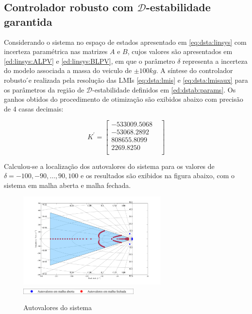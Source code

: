 \subsection{Controlador robusto com \( \mathcal{D}\)-estabilidade garantida}\label{subsec:res:control}
Considerando o sistema no espaço de estados apresentado em \eqref{eq:dsta:linsys} com incerteza paramétrica nas matrizes $A$ e $B$, cujos valores são apresentados em \eqref{ed:linsys:ALPV} e \eqref{ed:linsys:BLPV}, em que o parâmetro $\delta$ representa a incerteza do modelo associada a massa do veiculo de $\pm100kg$. A síntese do  controlador  robusto ́e  realizada  pela  resolução das LMIs \eqref{eq:dsta:lmis} e \eqref{eq:dsta:lmisaux} para os parâmetros da região de \( \mathcal{D}\)-estabilidade definidos em \eqref{ed:dstab:params}. Os ganhos obtidos do procedimento de otimização são exibidos abaixo com precisão de 4 casas decimais:

\begin{equation*} \label{eq:ganhoscontrolador}
    K^'=
    \begin{bmatrix}
        -533009.5068&\\	
        -53068.2892&\\	
        808655.8099&\\
        2269.8250&\\
    \end{bmatrix}
\end{equation*}

Calculou-se a localização dos autovalores do sistema para os valores de $\delta = -100, -90, \dots, 90, 100$ e os resultados são exibidos na figura abaixo, com o sistema em malha aberta e malha fechada.
\FloatBarrier
\begin{figure}[htbp]
    \begin{centering}
    \includegraphics[width=7.5cm]{img/regiao_d_estabilidade_autoval.png}
    \includegraphics[width=6cm]{img/regiao_d_estabilidade_autoval_leg.png}
    \caption{Autovalores do sistema}
    \label{fig:regiao_d_estabilidade_autoval_leg}
    \end{centering}
\end{figure}
\FloatBarrier


